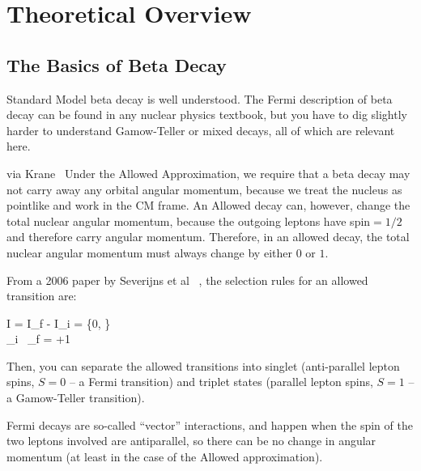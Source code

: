 


\clearpage
\chapter{Theoretical Overview}
\label{theory_chapter}

\section{The Basics of Beta Decay}
	Standard Model beta decay is well understood.  The Fermi description of beta decay can be found in any nuclear physics textbook, but you have to dig slightly harder to understand Gamow-Teller or mixed decays, all of which are relevant here.  
	
	via Krane~\cite{krane}
	Under the Allowed Approximation, we require that a beta decay may not carry away any orbital angular momentum, because we treat the nucleus as pointlike  and work in the CM frame.  An Allowed decay can, however, change the total nuclear angular momentum, because the outgoing leptons have spin$=1/2$ and therefore carry angular momentum.  Therefore, in an allowed decay, the total nuclear angular momentum must always change by either $0$ or $1$.  
	
	From a 2006 paper by Severijns et al ~\cite{severijns_beck_cuncic_2006}, the selection rules for an allowed transition are:
	
\bea
\Delta I = I_f - I_i = \{0, \} \\ 
\hat{\Pi}_i \, \hat{\Pi}_f = +1
\eea

	Then, you can separate the allowed transitions into singlet (anti-parallel lepton spins, $S=0$ -- a Fermi transition) and triplet states (parallel lepton spins, $S=1$ -- a Gamow-Teller transition).
	
	
	Fermi decays are so-called ``vector'' interactions, and happen when the spin of the two leptons involved are antiparallel, so there can be no change in angular momentum (at least in the case of the Allowed approximation).  
	
